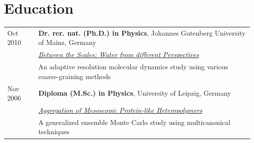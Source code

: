 \documentclass{article}
\begin{document}
\vspace{-1mm}
\section*{Education}
\begin{tabular}{ll}
Oct 2010& \textbf{Dr. rer. nat. (Ph.D.) in Physics}, Johannes Gutenberg University of Mainz, Germany\\
&\href{http://www.compphys.de/publications/2010e.pdf}{\textit{Between the Scales: Water from different Perspectives}}\\
&An adaptive resolution molecular dynamics study using various coarse-graining methods\\
Nov 2006&\textbf{Diploma (M.Sc.) in Physics}, University of Leipzig, Germany\\
&\href{http://www.compphys.de/publications/2006d.pdf}{\textit{Aggregation of Mesoscopic Protein-like Heteropolymers}}\\
&A generalized ensemble Monte Carlo study using multicanonical techniques\\
\end{tabular}

\vspace{-2mm}
\end{document}
